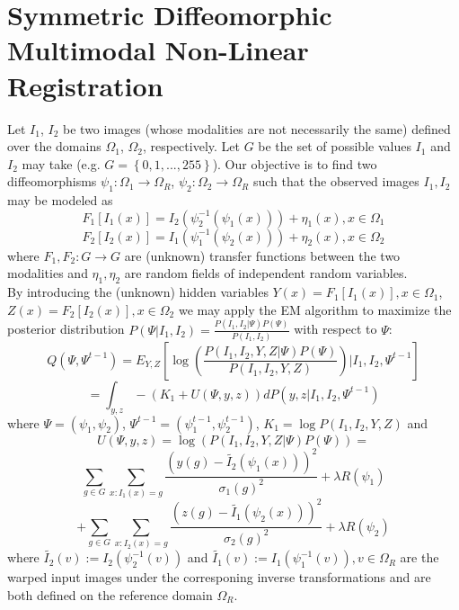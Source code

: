 \documentclass[11pt]{article}
\begin{document}
\section{Symmetric Diffeomorphic Multimodal Non-Linear Registration}
Let $I_1$, $I_2$ be two images (whose modalities are not necessarily the same) defined over the domains $\Omega_{1}$, $\Omega_{2}$, respectively. Let $G$ be the set of possible values $I_1$ and $I_2$ may take (e.g. $G=\left\lbrace 0,1,...,255\right\rbrace$). Our objective is to find two diffeomorphisms $\psi_{1}:\Omega_{1}\rightarrow \Omega_{R}$, $\psi_{2}:\Omega_{2}\rightarrow \Omega_{R}$ such that the observed images $I_{1}, I_{2}$ may be modeled as
\begin{equation}
	F_{1}[I_{1}(x)] = I_{2}(\psi_{2}^{-1}(\psi_{1}(x))) + \eta_{1}(x), x\in\Omega_{1}
\end{equation}
\begin{equation}
	F_{2}[I_{2}(x)] = I_{1}(\psi_{1}^{-1}(\psi_{2}(x))) + \eta_{2}(x), x\in\Omega_{2}
\end{equation}
where $F_{1}, F_{2}:G \rightarrow G$ are (unknown) transfer functions between the two modalities and $\eta_{1}, \eta_{2}$ are random fields of independent random variables.\\

By introducing the (unknown) hidden variables $Y(x)=F_{1}[I_{1}(x)], x\in \Omega_{1}$, $Z(x)=F_{2}[I_{2}(x)], x\in \Omega_{2}$ we may apply the EM algorithm to maximize the posterior distribution $P(\Psi | I_{1}, I_{2}) = \frac{P(I_{1}, I_{2} | \Psi)P(\Psi)}{P(I_{1}, I_{2})}$ with respect to $\Psi$:
\begin{equation}
	Q(\Psi, \Psi^{t-1}) = E_{Y,Z}\left[\log \left( \frac{P(I_{1}, I_{2}, Y, Z|\Psi)P(\Psi)}{P(I_{1}, I_{2}, Y, Z)}\right) | I_{1}, I_{2}, \Psi^{t-1}\right]
\end{equation}
\begin{equation}
=\int_{y,z} -(K_1 + U(\Psi, y, z))dP(y,z| I_{1}, I_{2}, \Psi^{t-1}) 
\end{equation}
where $\Psi = (\psi_{1}, \psi_{2})$, $\Psi^{t-1} = (\psi_{1}^{t-1}, \psi_{2}^{t-1})$, $K_{1} =\log P(I_{1}, I_{2}, Y, Z)$  and 
\begin{equation}
	U(\Psi, y, z) = \log \left(P(I_{1}, I_{2}, Y, Z|\Psi)P(\Psi)\right)=
\end{equation}
\begin{equation}
	\sum_{g\in G} \sum_{x : I_{1}(x) = g} \frac{\left(y(g) - \tilde{I_{2}}(\psi_{1}(x))\right)^{2}}{\sigma_{1}(g)^{2}} + \lambda R(\psi_{1})
\end{equation}
\begin{equation}
	+\sum_{g\in G} \sum_{x : I_{2}(x) = g} \frac{\left(z(g) - \tilde{I_{1}}(\psi_{2}(x))\right)^{2}}{\sigma_{2}(g)^{2}} + \lambda R(\psi_{2})
\end{equation}
where $\tilde{I_{2}}(v) := I_{2}(\psi_{2}^{-1}(v))$ and $\tilde{I_{1}}(v) := I_{1}(\psi_{1}^{-1}(v)), v\in \Omega_{R}$ are the warped input images under the corresponing inverse transformations and are both defined on the reference domain $\Omega_{R}$.\\
\end{document}
